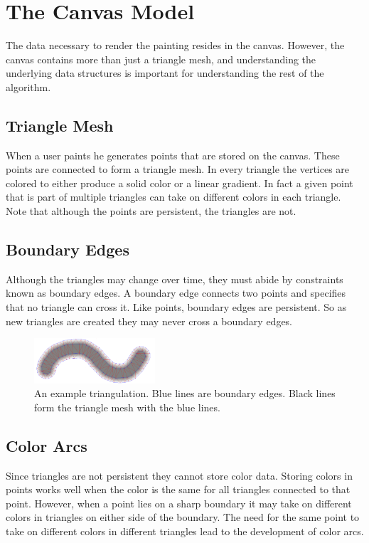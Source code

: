 \documentclass[conference]{acmsiggraph}
\begin{document}
\section{The Canvas Model}
The data necessary to render the painting resides in the canvas. However, the canvas contains more than just
a triangle mesh, and understanding the underlying data structures is important for 
understanding the rest of the algorithm.

\subsection{Triangle Mesh}
When a user paints he generates points that are stored on the canvas. These points are
connected to form a triangle mesh. In every triangle the vertices are colored to either
produce a solid color or a linear gradient. In fact a given point that is part of
multiple triangles can take on different colors in each triangle. Note that although
the points are persistent, the triangles are not.

\subsection{Boundary Edges}
Although the triangles may change over time, they must abide by constraints known as
boundary edges. A boundary edge connects two points and specifies that no triangle
can cross it. Like points, boundary edges are persistent. So as new triangles are created they
may never cross a boundary edges.


\begin{figure}
    \centering
        \includegraphics[width=0.4\textwidth]{images/stroke}
    \caption{An example triangulation. Blue lines are boundary edges. Black lines form the triangle
    mesh with the blue lines.}
\end{figure}

\subsection{Color Arcs}
Since triangles are not persistent they cannot store color data.
Storing colors in points works well when the color is the same for all triangles connected
to that point. However, when a point lies on a sharp boundary it may take on different colors in
triangles on either side of the boundary. The need for the same point to take on different
colors in different triangles lead to the development of color arcs.
\end{document}
